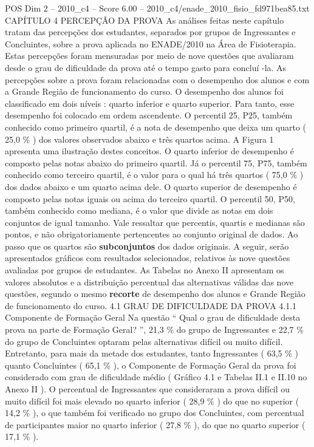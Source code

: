 \begin{textsample}{POS Dim 2 – 2010\_c4 – Score 6.00 – 2010\_c4/enade\_2010\_fisio\_fd971bea85.txt}  \label{ex:f2_pos_143}
CAPÍTULO 4 PERCEPÇÃO DA PROVA As análises feitas neste capítulo tratam das percepções dos estudantes, separados por grupos de Ingressantes e Concluintes, sobre a prova aplicada no ENADE/2010 na Área de Fisioterapia.
Estas percepções foram mensuradas por meio de nove questões que avaliaram desde o grau de dificuldade da prova até o tempo gasto para concluí -la.
As percepções sobre a prova foram relacionadas com o desempenho dos alunos e com a Grande Região de funcionamento do curso.
O desempenho dos alunos foi classificado em dois níveis : quarto inferior e quarto superior.
Para tanto, esse desempenho foi colocado em ordem ascendente.
O percentil 25, P25, também conhecido como primeiro quartil, é a nota de desempenho que deixa um quarto ( 25,0 \% ) dos valores observados abaixo e três quartos acima.
A Figura 1 apresenta uma ilustração destes conceitos.
O quarto inferior de desempenho é composto pelas notas abaixo do primeiro quartil.
Já o percentil 75, P75, também conhecido como terceiro quartil, é o valor para o qual há três quartos ( 75,0 \% ) dos dados abaixo e um quarto acima dele.
O quarto superior de desempenho é composto pelas notas iguais ou acima do terceiro quartil.
O percentil 50, P50, também conhecido como mediana, é o valor que divide as notas em dois conjuntos de igual tamanho.
Vale ressaltar que percentis, quartis e medianas são pontos, e não obrigatoriamente pertencentes ao conjunto original de dados.
Ao passo que os quartos são \textbf{subconjuntos} dos dados originais.
A seguir, serão apresentados gráficos com resultados selecionados, relativos às nove questões avaliadas por grupos de estudantes.
As Tabelas no Anexo II apresentam os valores absolutos e a distribuição percentual das alternativas válidas das nove questões, segundo o mesmo \textbf{recorte} de desempenho dos alunos e Grande Região de funcionamento do curso. 4.1 GRAU DE DIFICULDADE DA PROVA 4.1.1 Componente de Formação Geral Na questão “ Qual o grau de dificuldade desta prova na parte de Formação Geral? ”, 21,3 \% do grupo de Ingressantes e 22,7 \% do grupo de Concluintes optaram pelas alternativas difícil ou muito difícil.
Entretanto, para mais da metade dos estudantes, tanto Ingressantes ( 63,5 \% ) quanto Concluintes ( 65,1 \% ), o Componente de Formação Geral da prova foi considerado com grau de dificuldade médio ( Gráfico 4.1 e Tabelas II.1 e II.10 no Anexo II ).
O percentual de Ingressantes que consideraram a prova difícil ou muito difícil foi mais elevado no quarto inferior ( 28,9 \% ) do que no superior ( 14,2 \% ), o que também foi verificado no grupo dos Concluintes, com percentual de participantes maior no quarto inferior ( 27,8 \% ), do que no quarto superior ( 17,1 \% ).

\end{textsample}
